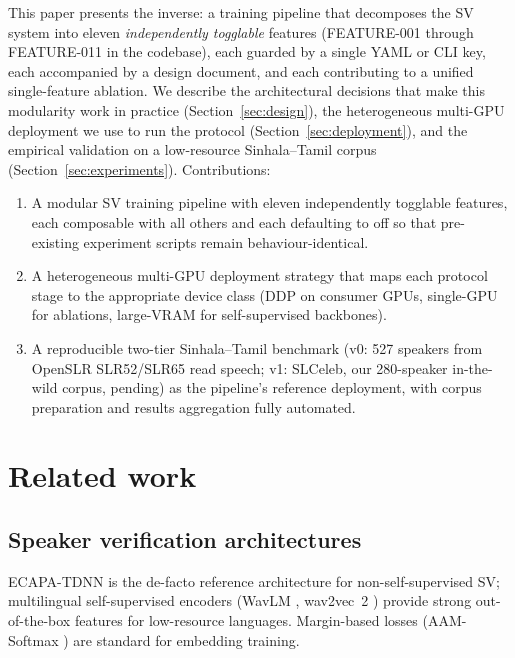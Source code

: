 \documentclass[11pt,a4paper]{article}
\begin{document}
This paper presents the inverse: a training pipeline that decomposes
the SV system into eleven \emph{independently togglable} features
(FEATURE-001 through FEATURE-011 in the codebase), each guarded by a
single YAML or CLI key, each accompanied by a design document, and
each contributing to a unified single-feature ablation. We describe
the architectural decisions that make this modularity work in
practice (Section~\ref{sec:design}), the heterogeneous multi-GPU
deployment we use to run the protocol (Section~\ref{sec:deployment}),
and the empirical validation on a low-resource Sinhala--Tamil corpus
(Section~\ref{sec:experiments}). Contributions:

\begin{enumerate}
    \item A modular SV training pipeline with eleven independently
    togglable features, each composable with all others and each
    defaulting to off so that pre-existing experiment scripts remain
    behaviour-identical.
    \item A heterogeneous multi-GPU deployment strategy that maps
    each protocol stage to the appropriate device class (DDP on
    consumer GPUs, single-GPU for ablations, large-VRAM for
    self-supervised backbones).
    \item A reproducible two-tier Sinhala--Tamil benchmark (v0: 527
    speakers from OpenSLR SLR52/SLR65 read speech; v1: SLCeleb, our
    280-speaker in-the-wild corpus, pending) as the pipeline's
    reference deployment, with corpus preparation and results
    aggregation fully automated.
\end{enumerate}

\section{Related work}
\label{sec:related}

\subsection{Speaker verification architectures}

ECAPA-TDNN \cite{desplanques2020ecapa} is the de-facto reference
architecture for non-self-supervised SV; multilingual self-supervised
encoders (WavLM \cite{chen2022wavlm}, wav2vec~2 \cite{baevski2020wav2vec2})
provide strong out-of-the-box features for low-resource languages.
Margin-based losses (AAM-Softmax \cite{deng2019arcface}) are standard
for embedding training.
\end{document}
